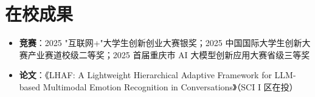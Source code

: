 \documentclass[10pt]{article}
\begin{document}



    \section[在校成果]{\makebox[\iconwidth][c]{\color{primarycolor}{\faAward}}\quad 在校成果}
    \begin{itemize}
        \item \textbf{竞赛}：2025 "互联网+"大学生创新创业大赛银奖；2025 中国国际大学生创新大赛产业赛道校级二等奖；2025 首届重庆市 AI 大模型创新应用大赛省级三等奖
        \item \textbf{论文}：《LHAF: A Lightweight Hierarchical Adaptive Framework for LLM-based Multimodal Emotion Recognition in Conversations》（SCI I 区在投）
    \end{itemize}
\end{document}

